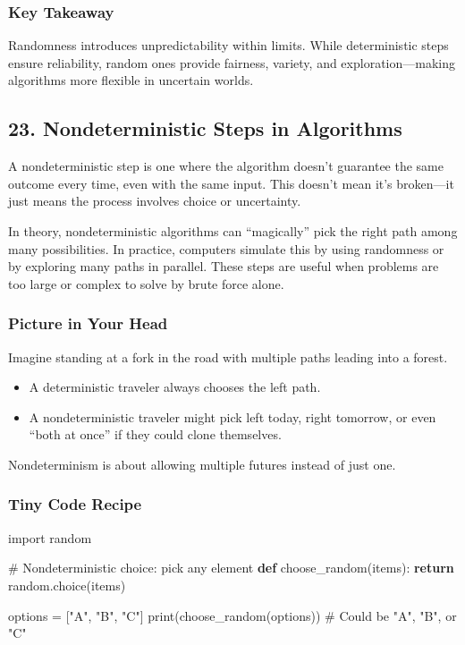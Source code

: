 \documentclass[
  letterpaper,
  DIV=11,
  numbers=noendperiod]{scrreprt}
\newenvironment{Shaded}{\begin{snugshade}}{\end{snugshade}}
\newcommand{\BuiltInTok}[1]{\textcolor[rgb]{0.00,0.23,0.31}{#1}}
\newcommand{\CommentTok}[1]{\textcolor[rgb]{0.37,0.37,0.37}{#1}}
\newcommand{\ControlFlowTok}[1]{\textcolor[rgb]{0.00,0.23,0.31}{\textbf{#1}}}
\newcommand{\ImportTok}[1]{\textcolor[rgb]{0.00,0.46,0.62}{#1}}
\newcommand{\KeywordTok}[1]{\textcolor[rgb]{0.00,0.23,0.31}{\textbf{#1}}}
\newcommand{\NormalTok}[1]{\textcolor[rgb]{0.00,0.23,0.31}{#1}}
\newcommand{\OperatorTok}[1]{\textcolor[rgb]{0.37,0.37,0.37}{#1}}
\newcommand{\StringTok}[1]{\textcolor[rgb]{0.13,0.47,0.30}{#1}}
\providecommand{\tightlist}{%
  \setlength{\itemsep}{0pt}\setlength{\parskip}{0pt}}
\begin{document}
\subsubsection{Key Takeaway}\label{key-takeaway-20}

Randomness introduces unpredictability within limits. While
deterministic steps ensure reliability, random ones provide fairness,
variety, and exploration---making algorithms more flexible in uncertain
worlds.

\subsection{23. Nondeterministic Steps in
Algorithms}\label{nondeterministic-steps-in-algorithms}

A nondeterministic step is one where the algorithm doesn't guarantee the
same outcome every time, even with the same input. This doesn't mean
it's broken---it just means the process involves choice or uncertainty.

In theory, nondeterministic algorithms can ``magically'' pick the right
path among many possibilities. In practice, computers simulate this by
using randomness or by exploring many paths in parallel. These steps are
useful when problems are too large or complex to solve by brute force
alone.

\subsubsection{Picture in Your Head}\label{picture-in-your-head-22}

Imagine standing at a fork in the road with multiple paths leading into
a forest.

\begin{itemize}
\tightlist
\item
  A deterministic traveler always chooses the left path.
\item
  A nondeterministic traveler might pick left today, right tomorrow, or
  even ``both at once'' if they could clone themselves.
\end{itemize}

Nondeterminism is about allowing multiple futures instead of just one.

\subsubsection{Tiny Code Recipe}\label{tiny-code-recipe-20}

\begin{Shaded}
\begin{Highlighting}[]
\ImportTok{import}\NormalTok{ random}

\CommentTok{\# Nondeterministic choice: pick any element}
\KeywordTok{def}\NormalTok{ choose\_random(items):}
    \ControlFlowTok{return}\NormalTok{ random.choice(items)}

\NormalTok{options }\OperatorTok{=}\NormalTok{ [}\StringTok{"A"}\NormalTok{, }\StringTok{"B"}\NormalTok{, }\StringTok{"C"}\NormalTok{]}
\BuiltInTok{print}\NormalTok{(choose\_random(options))  }\CommentTok{\# Could be "A", "B", or "C"}
\end{Highlighting}
\end{Shaded}
\end{document}
